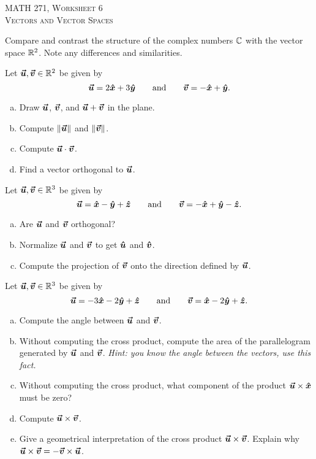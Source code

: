 \documentclass[12pt]{article} %
\begin{document}
\begin{center}
   \textsc{\large MATH 271, Worksheet 6}\\
   \textsc{Vectors and Vector Spaces}
\end{center}
\vspace{.5cm}

\begin{problem}
Compare and contrast the structure of the complex numbers $\C$ with the vector space $\R^2$.  Note any differences and similarities.
\end{problem}

\begin{problem}
Let $\vecu,\vecv\in \R^2$ be given by
\[
\vecu = 2\xhat + 3 \yhat \qquad \textrm{and} \qquad \vecv = -\xhat +\yhat.
\]
\begin{enumerate}[(a)]
    \item Draw $\vecu$, $\vecv$, and $\vecu + \vecv$ in the plane.
    \item Compute $\|\vecu\|$ and $\|\vecv\|$.
    \item Compute $\vecu \cdot \vecv$.
    \item Find a vector orthogonal to $\vecu$.
\end{enumerate}
\end{problem}

\begin{problem}
Let $\vecu,\vecv\in \R^3$ be given by
\[
\vecu = \xhat - \yhat + \zhat \qquad \textrm{and} \qquad \vecv = -\xhat + \yhat - \zhat.
\]
\begin{enumerate}[(a)]
    \item Are $\vecu$ and $\vecv$ orthogonal?
    \item Normalize $\vecu$ and $\vecv$ to get $\uhat$ and $\vhat$. 
    \item Compute the projection of $\vecv$ onto the direction defined by $\vecu$.
\end{enumerate}
\end{problem}

\begin{problem}
Let $\vecu,\vecv \in \R^3$ be given by
\[
\vecu = -3\xhat -2\yhat + \zhat \qquad \textrm{and} \qquad \vecv = \xhat -2\yhat +\zhat.
\]
\begin{enumerate}[(a)]
    \item Compute the angle between $\vecu$ and $\vecv$.
    \item Without computing the cross product, compute the area of the parallelogram generated by $\vecu$ and $\vecv$. \emph{Hint: you know the angle between the vectors, use this fact.}
    \item Without computing the cross product, what component of the product $\vecu\times\xhat$ must be zero? 
    \item Compute $\vecu\times \vecv$.
    \item Give a geometrical interpretation of the cross product $\vecu\times \vecv$. Explain why $\vecu\times \vecv = -\vecv \times \vecu$.
\end{enumerate}
\end{problem}
\end{document}
